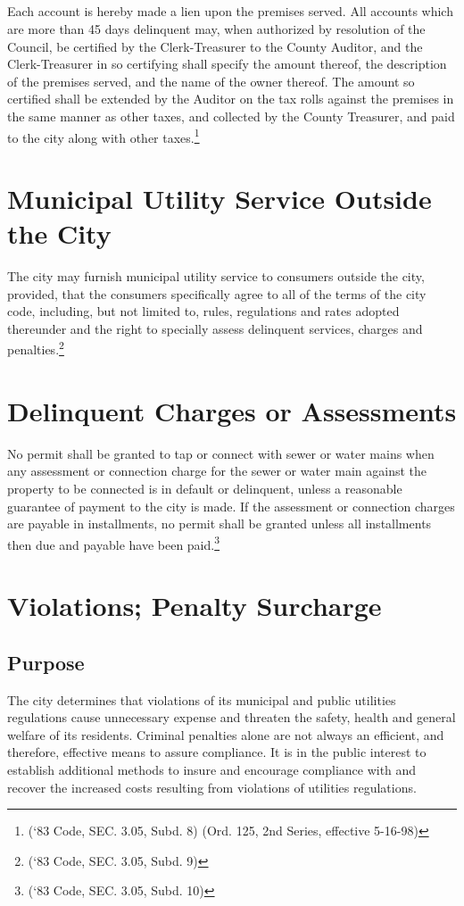 \subsection{}
Each account is hereby made a lien upon the premises served. All accounts which are more than 45 days delinquent may, when authorized by resolution of the Council, be certified by the Clerk-Treasurer to the County Auditor, and the Clerk-Treasurer in so certifying shall specify the amount thereof, the description of the premises served, and the name of the owner thereof. The amount so certified shall be extended by the Auditor on the tax rolls against the premises in the same manner as other taxes, and collected by the County Treasurer, and paid to the city along with other taxes.\footnote{(‘83 Code, SEC. 3.05, Subd. 8) (Ord. 125, 2nd Series, effective 5-16-98)}

\section{Municipal Utility Service Outside the City}
The city may furnish municipal utility service to consumers outside the city, provided, that the consumers specifically agree to all of the terms of the city code, including, but not limited to, rules, regulations and rates adopted thereunder and the right to specially assess delinquent services, charges and penalties.\footnote{(‘83 Code, SEC. 3.05, Subd. 9)}

\section{Delinquent Charges or Assessments}
No permit shall be granted to tap or connect with sewer or water mains when any assessment or connection charge for the sewer or water main against the property to be connected is in default or delinquent, unless a reasonable guarantee of payment to the city is made.  If the assessment or connection charges are payable in installments, no permit shall be granted unless all installments then due and payable have been paid.\footnote{(‘83 Code, SEC. 3.05, Subd. 10)}

\setcounter{section}{97}
\section{Violations; Penalty Surcharge}
\subsection{Purpose}
The city determines that violations of its municipal and public utilities regulations cause unnecessary expense and threaten the safety, health and general welfare of its residents.  Criminal penalties alone are not always an efficient, and therefore, effective means to assure compliance.  It is in the public interest to establish additional methods to insure and encourage compliance with and recover the increased costs resulting from violations of utilities regulations.
